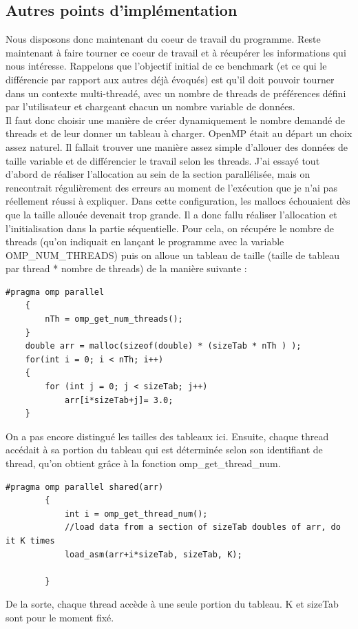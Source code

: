 \documentclass{report}
\begin{document}
\subsection{Autres points d'implémentation}
Nous disposons donc maintenant du coeur de travail du programme. Reste maintenant à faire tourner
ce coeur de travail et à récupérer les informations qui nous intéresse. Rappelons que l'objectif initial
de ce benchmark (et ce qui le différencie par rapport aux autres déjà évoqués) est qu'il doit pouvoir
tourner dans un contexte multi-threadé, avec un nombre de threads de préférences défini par l'utilisateur
et chargeant chacun un nombre variable de données. 
\\Il faut donc choisir une manière de créer dynamiquement le nombre demandé de threads et de leur donner
un tableau à charger. OpenMP était au départ un choix assez naturel. Il fallait trouver une manière
assez simple d'allouer des données de taille variable et de différencier le travail selon les threads.
J'ai essayé tout d'abord de réaliser l'allocation au sein de la section parallélisée, mais on rencontrait
régulièrement des erreurs au moment de l'exécution que je n'ai pas réellement réussi à expliquer. Dans
cette configuration, les mallocs échouaient dès que la taille allouée devenait trop grande. Il a donc
fallu réaliser l'allocation et l'initialisation dans la partie séquentielle. Pour cela, on récupére
le nombre de threads (qu'on indiquait en lançant le programme avec la variable 
OMP\_NUM\_THREADS) puis on alloue un tableau de taille (taille de tableau par thread *
nombre de threads) de la manière suivante : 
\begin{lstlisting}
#pragma omp parallel
	{
		nTh = omp_get_num_threads();
	}
	double arr = malloc(sizeof(double) * (sizeTab * nTh ) );
	for(int i = 0; i < nTh; i++)
	{
		for (int j = 0; j < sizeTab; j++)
			arr[i*sizeTab+j]= 3.0;
	}
\end{lstlisting}
On a pas encore distingué les tailles des tableaux ici. Ensuite, chaque thread accédait à sa portion
du tableau qui est déterminée selon son identifiant de thread, qu'on obtient grâce à la fonction
omp\_get\_thread\_num.
\begin{lstlisting}
#pragma omp parallel shared(arr)
		{
			int i = omp_get_thread_num();
			//load data from a section of sizeTab doubles of arr, do it K times
			load_asm(arr+i*sizeTab, sizeTab, K);

		}
\end{lstlisting}
De la sorte, chaque thread accède à une seule portion du tableau. K et sizeTab sont pour le moment fixé.
\end{document}
